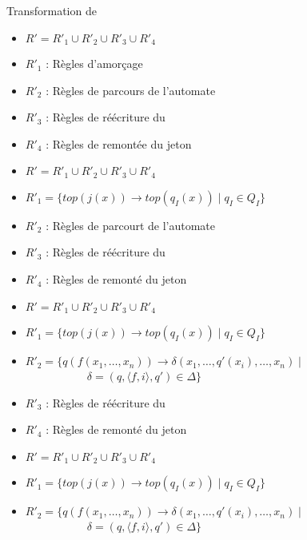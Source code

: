 \begin{frame}{Transformation de \pctrs}
  \begin{overprint}
    \begin{itemize}
    \item $R' = R'_1 \cup R'_2 \cup R'_3 \cup R'_4$
    \item $R'_1$ : Règles d'amorçage
    \item $R'_2$ : Règles de parcours de l'automate
    \item $R'_3$ : Règles de réécriture du \pctrs
    \item $R'_4$ : Règles de remontée du jeton
    \end{itemize}
    \begin{itemize}
    \item $R' = R'_1 \cup R'_2 \cup R'_3 \cup R'_4$
    \item $R'_1 = \{top(j(x)) \rightarrow top(q_I(x)) \mid q_I \in Q_I\}$
    \item $R'_2$ : Règles de parcourt de l'automate
    \item $R'_3$ : Règles de réécriture du \pctrs
    \item $R'_4$ : Règles de remonté du jeton
    \end{itemize}
    \begin{itemize}
    \item $R' = R'_1 \cup R'_2 \cup R'_3 \cup R'_4$
    \item $R'_1 = \{top(j(x)) \rightarrow top(q_I(x)) \mid q_I \in Q_I\}$
    \item $R'_2 = \{q(f(x_1,\ldots,x_n))\rightarrow \delta(x_1,\ldots,q'(x_i),\ldots,x_n) \mid$\\
      ~~~~~~~~~~~$\delta=(q, \langle f,i \rangle, q') \in \Delta\}$
    \item $R'_3$ : Règles de réécriture du \pctrs
    \item $R'_4$ : Règles de remonté du jeton
    \end{itemize}
    \begin{itemize}
    \item $R' = R'_1 \cup R'_2 \cup R'_3 \cup R'_4$
    \item $R'_1 = \{top(j(x)) \rightarrow top(q_I(x)) \mid q_I \in Q_I\}$
    \item $R'_2 = \{q(f(x_1,\ldots,x_n))\rightarrow \delta(x_1,\ldots,q'(x_i),\ldots,x_n) \mid$\\
      ~~~~~~~~~~~$\delta=(q, \langle f,i \rangle, q') \in \Delta\}$

\end{itemize}
\end{overprint}
\end{frame}
